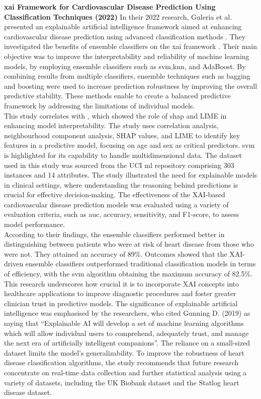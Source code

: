 \noindent
\textbf{\gls{xai} Framework for Cardiovascular Disease Prediction Using Classification Techniques (2022)}
In their 2022 research, Guleria et al. presented an explainable artificial intelligence framework aimed at enhancing cardiovascular disease prediction using advanced classification methods \citep{guleria2022comprehensive}. They investigated the benefits of ensemble classifiers on the \gls{xai} framework \citep{baghdadi2023advanced}. Their main objective was to improve the interpretability and reliability of machine learning models, by employing ensemble classifiers such as \gls{svm},\gls{knn}, and AdaBoost. By combining results from multiple classifiers, ensemble techniques such as bagging and boosting were used to increase prediction robustness by improving the overall predictive stability. These methods enable to create a balanced predictive framework by addressing the limitations of individual models.\\ This study correlates with \cite{bizimana2024automated}, which showed the role of \gls{shap} and LIME in enhancing model interpretability. The study uses correlation analysis, neighbourhood component analysis, SHAP values, and LIME to identify key features in a predictive model, focusing on age and sex as critical predictors. \gls{svm} is highlighted for its capability to handle multidimensional data. The dataset used in this study was sourced from the UCI \gls{ml} repository comprising 303 instances and 14 attributes. The study illustrated the need for explainable models in clinical settings, where understanding the reasoning behind predictions is crucial for effective decision-making. The effectiveness of the XAI-based cardiovascular disease prediction models was evaluated using a variety of evaluation criteria, such as \gls{auc}, accuracy, sensitivity, and F1-score, to assess model performance. \\
According to their findings, the ensemble classifiers performed better in distinguishing between patients who were at risk of heart disease from those who were not. They attained an accuracy of 89\%. Outcomes showed that the XAI-driven ensemble classifiers outperformed traditional classification models in terms of efficiency, with the \gls{svm} algorithm obtaining the maximum accuracy of 82.5\%. \\
This research underscores how crucial it is to incorporate XAI concepts into healthcare applications to improve diagnostic procedures and foster greater clinician trust in predictive models. The significance of explainable artificial intelligence was emphasised by the researchers, who cited Gunning D. (2019) as saying that “Explainable AI will develop a set of machine learning algorithms which will allow individual users to comprehend, adequately trust, and manage the next era of artificially intelligent companions”. The reliance on a small-sized dataset limits the model's generalizability. To improve the robustness of heart disease classification algorithms, the study recommends that future research concentrate on real-time data collection and further statistical analysis using a variety of datasets, including the UK Biobank dataset and the Statlog heart disease dataset.
\vspace{0.5 cm}

